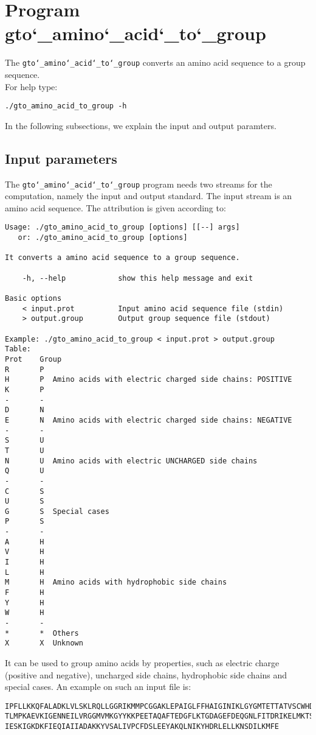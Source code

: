 \section{Program gto\char`_amino\char`_acid\char`_to\char`_group}

The \texttt{gto\char`_amino\char`_acid\char`_to\char`_group} converts an amino acid sequence to a group 
sequence.\\
For help type:
\begin{lstlisting}
./gto_amino_acid_to_group -h
\end{lstlisting}
In the following subsections, we explain the input and output paramters.

\subsection*{Input parameters}

The \texttt{gto\char`_amino\char`_acid\char`_to\char`_group} program needs two streams for the computation,
namely the input and output standard. The input stream is an amino acid sequence.
The attribution is given according to:
\begin{lstlisting}
Usage: ./gto_amino_acid_to_group [options] [[--] args]
   or: ./gto_amino_acid_to_group [options]

It converts a amino acid sequence to a group sequence.

    -h, --help            show this help message and exit

Basic options
    < input.prot          Input amino acid sequence file (stdin)
    > output.group        Output group sequence file (stdout)

Example: ./gto_amino_acid_to_group < input.prot > output.group
Table:
Prot	Group
R		P
H		P  Amino acids with electric charged side chains: POSITIVE
K		P
-		-
D		N
E		N  Amino acids with electric charged side chains: NEGATIVE
-		-
S		U
T		U
N		U  Amino acids with electric UNCHARGED side chains
Q		U
-		-
C		S
U		S
G		S  Special cases
P		S
-		-
A		H
V		H
I		H
L		H
M		H  Amino acids with hydrophobic side chains
F		H
Y		H
W		H
-		-
*		*  Others
X		X  Unknown
\end{lstlisting}
It can be used to group amino acids by properties, such as electric charge (positive
and negative), uncharged side chains, hydrophobic side chains and special cases.
An example on such an input file is:
\begin{lstlisting}
IPFLLKKQFALADKLVLSKLRQLLGGRIKMMPCGGAKLEPAIGLFFHAIGINIKLGYGMTETTATVSCWHDFQFNPNSIG
TLMPKAEVKIGENNEILVRGGMVMKGYYKKPEETAQAFTEDGFLKTGDAGEFDEQGNLFITDRIKELMKTSNGKYIAPQY
IESKIGKDKFIEQIAIIADAKKYVSALIVPCFDSLEEYAKQLNIKYHDRLELLKNSDILKMFE
\end{lstlisting}

